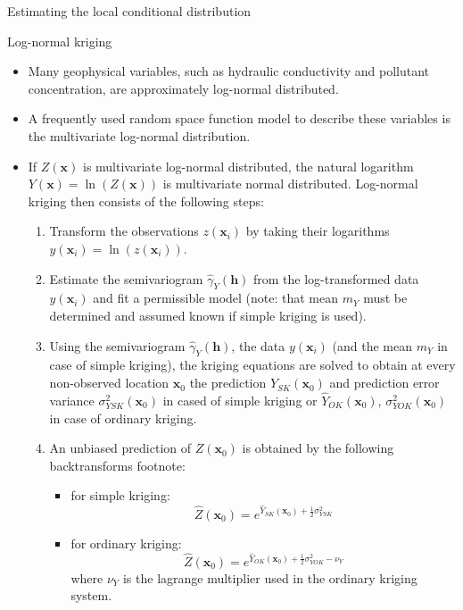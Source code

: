 \documentclass[8pt]{beamer}
\renewcommand{\emph}[1]{\textcolor{myorange}{#1}}
\begin{document}
\begin{frame}{Estimating the local conditional distribution}
     \begin{block}{Log-normal kriging}
    \end{block}
    \begin{itemize}
        \item Many geophysical variables, such as \emph{hydraulic conductivity} and \emph{pollutant concentration}, are approximately \emph{log-normal distributed}.
        \item A frequently used \emph{random space function} model to describe these variables is the \emph{multivariate log-normal distribution}.
        \item If $Z(\mathbf{x})$ is \emph{multivariate log-normal distributed}, the natural logarithm $Y(\mathbf{x})=\ln(Z(\mathbf{x}))$ is \emph{multivariate normal distributed}. \alert{Log-normal kriging} then consists of the following steps:
            \begin{enumerate}
                \item Transform the observations $z(\mathbf{x}_i)$ by taking their logarithms $y(\mathbf{x}_i) = \ln(z(\mathbf{x}_i))$.
                \item Estimate the \emph{semivariogram} $\hat{\gamma}_Y (\mathbf{h})$ from the log-transformed data $y(\mathbf{x}_i)$ and fit a permissible model (note: that mean $m_Y$ must be determined and assumed known if \emph{simple kriging} is used).                 
                \item Using the \emph{semivariogram} $\hat{\gamma}_Y (\mathbf{h})$, the data $y(\mathbf{x}_i)$ (and the mean $m_Y$ in case of \emph{simple kriging}), the kriging equations are solved to obtain at every non-observed location $\mathbf{x}_0$ the \emph{prediction} $\hat{Y}_{SK} (\mathbf{x}_0)$ and \emph{prediction error variance} $\sigma_{YSK}^2 (\mathbf{x}_0)$ in cased of \emph{simple kriging} or $\hat{Y}_{OK} (\mathbf{x}_0)$, $\sigma_{YOK}^2 (\mathbf{x}_0)$ in case of \emph{ordinary kriging}.
                \item An unbiased prediction of $Z(\mathbf{x}_0)$ is obtained by the following backtransforms footnote:
                    \begin{itemize}
                        \item for \emph{simple kriging}:
            \begin{equation}
                \hat{Z}(\mathbf{x}_0) = e^{\hat{Y}_{SK} (\mathbf{x}_0) + \frac{1}{2}\sigma_{YSK}^2}
                \label{e732}
            \end{equation}
                        \item for \emph{ordinary kriging}:
            \begin{equation}
                \hat{Z}(\mathbf{x}_0) = e^{\hat{Y}_{OK} (\mathbf{x}_0) + \frac{1}{2}\sigma_{YOK}^2 - \nu_Y}
                \label{e733}
            \end{equation}
            where $\nu_Y$ is the \emph{lagrange multiplier} used in the \emph{ordinary kriging} system.


\end{itemize}
\end{enumerate}
\end{itemize}
\end{frame}
\end{document}
